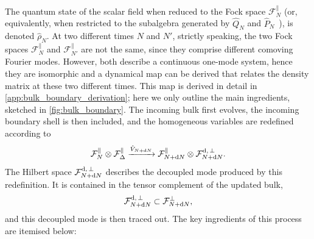 \documentclass{article}
\numberwithin{equation}{section}
\begin{document}
	The quantum state of the scalar field when reduced to the Fock space $\mathcal{F}_N^\parallel$ (or, equivalently, when restricted to the subalgebra generated by \(\hat Q_N\) and \(\hat P_N\)~\cite{Haag1996LocalQuantumPhysics, Fewster:2019ixc}), is denoted $\hat\rho_N$. At two different times $N$ and $N'$, strictly speaking, the two Fock spaces $\mathcal{F}_N^\parallel$ and $\mathcal{F}_{N'}^\parallel$ are not the same, since they comprise different comoving Fourier modes. However, both describe a continuous one-mode system, hence they are isomorphic and a dynamical map can be derived that relates the density matrix at these two different times. This map is derived in detail in \cref{app:bulk_boundary_derivation}; here we only outline the main ingredients, sketched in \cref{fig:bulk_boundary}. The incoming bulk first evolves, the incoming boundary shell is then included, and the homogeneous variables are redefined according to
    \begin{equation}
        \mathcal F_N^\parallel\otimes\mathcal F_\Delta^\parallel
        \xrightarrow{\hat V_{N+\dd N}}
        \mathcal F_{N+\dd N}^\parallel\otimes\mathcal F^{\rm d,\,\perp}_{N+\dd N}.
    \end{equation}
    The Hilbert space \(\mathcal F^{\rm d,\,\perp}_{N+\dd N}\) describes the decoupled mode produced by this redefinition. It is contained in the tensor complement of the updated bulk,
    \begin{equation}
        \mathcal F^{\rm d,\,\perp}_{N+\dd N}
        \subset
        \mathcal F^\perp_{N+\dd N},
    \end{equation}
    and this decoupled mode is then traced out. The key ingredients of this process are itemised below:
\end{document}
